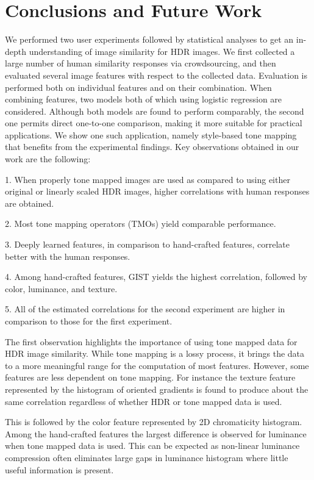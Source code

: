 \chapter{Conclusions and Future Work}
\label{chp:b6}

We performed two user experiments followed by statistical analyses to get an in-depth understanding of image similarity for HDR images. We first collected a large number of human similarity responses via crowdsourcing, and then evaluated several image features with respect to the collected data. Evaluation is performed both on individual features and on their combination.
When combining features, two models both of which using logistic regression are considered. Although both models are found to perform comparably, the second one permits direct one-to-one comparison, making it more suitable for practical applications. We show one such application, namely style-based tone mapping that benefits from the experimental findings. Key observations obtained in our work are the following:

1. When properly tone mapped images are used as compared to using either original or linearly scaled HDR images, higher correlations with human responses are obtained.

2. Most tone mapping operators (TMOs) yield comparable performance.

3. Deeply learned features, in comparison to hand-crafted
features, correlate better with the human responses.

4. Among hand-crafted features, GIST yields the highest correlation, followed by color, luminance, and texture.

5. All of the estimated correlations for the second experiment are higher in comparison to those for the first experiment.

The first observation highlights the importance of using tone mapped data for HDR image similarity. While tone mapping is a lossy process, it brings the data to a more meaningful range for the computation of most features. However, some features are less dependent on tone mapping. For instance the texture feature represented by the histogram of oriented gradients is found to produce about the same correlation regardless of whether HDR or tone mapped data is used.

This is followed by the color feature represented by 2D chromaticity histogram. Among the hand-crafted features the largest difference is observed for luminance when tone mapped data is used. This can be expected as non-linear luminance compression often eliminates
large gaps in luminance histogram where little useful
information is present.

